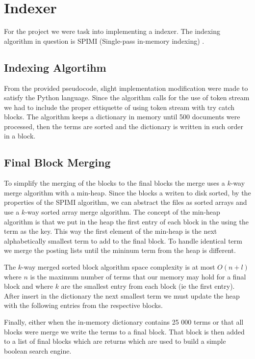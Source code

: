 \section{Indexer}

\par For the project we were task into implementing a indexer. The indexing algorithm in question is SPIMI (Single-pass in-memory indexing) \cite{spimi-algorithm}. 

\subsection{Indexing Algortihm}

\par From the provided pseudocode, slight implementation modification were made to satisfy the Python language. Since the algorithm calls for the use of token stream we had to include the proper ettiquette of using token stream with try catch blocks. The algorithm keeps a dictionary in memory until 500 documents were processed, then the terms are sorted and the dictionary is written in such order in a block.

\subsection{Final Block Merging}

\par To simplify the merging of the blocks to the final blocks the merge uses a $k$-way merge algorithm with a min-heap. Since the blocks a writen to disk sorted, by the properties of the SPIMI algorithm, we can abstract the files as sorted arrays and use
a $k$-way sorted array merge algorithm. The concept of the min-heap algorithm is that we put in the heap the first entry of each block in the using the term as the key. This way the first element of the min-heap is the next alphabetically smallest term to add to the final block. To handle identical term we merge the posting lists until the mininum term from the heap is different.
\par The $k$-way merged sorted block algorithm space complexity is at most $O(n+l)$ where $n$ is the maximum number of terms that our memory may hold for a final block and where $k$ are the smallest entry from each block (ie the first entry). After insert in the dictionary the next smallest term we must update the heap with the following entries from the respective blocks.
\par Finally, either when the in-memory dictionary contains 25 000 terms or that all blocks were merge we write the terms to a final block. That block is then added to a list of final blocks which are returns which are used to build a simple boolean search engine.

